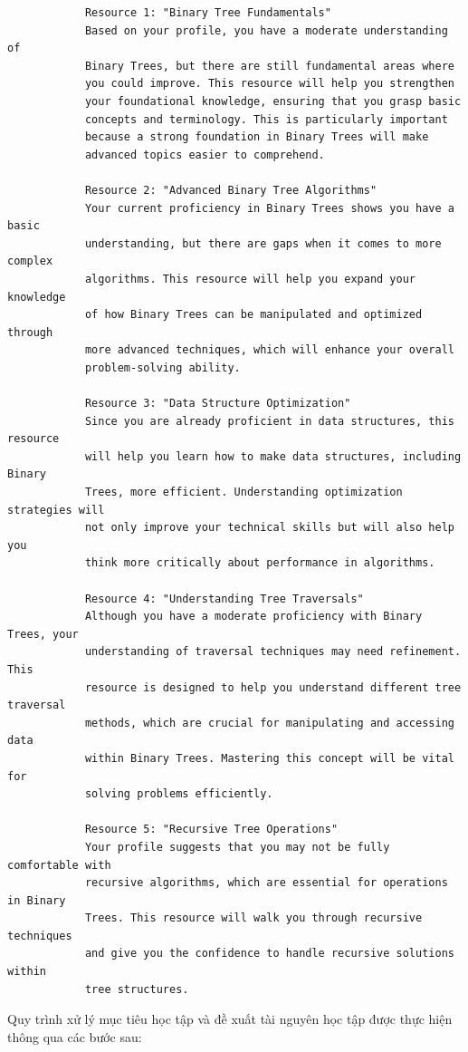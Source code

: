 \begin{verbatim}
            Resource 1: "Binary Tree Fundamentals"
            Based on your profile, you have a moderate understanding of
            Binary Trees, but there are still fundamental areas where
            you could improve. This resource will help you strengthen
            your foundational knowledge, ensuring that you grasp basic
            concepts and terminology. This is particularly important
            because a strong foundation in Binary Trees will make 
            advanced topics easier to comprehend.

            Resource 2: "Advanced Binary Tree Algorithms"
            Your current proficiency in Binary Trees shows you have a basic
            understanding, but there are gaps when it comes to more complex
            algorithms. This resource will help you expand your knowledge 
            of how Binary Trees can be manipulated and optimized through 
            more advanced techniques, which will enhance your overall 
            problem-solving ability.

            Resource 3: "Data Structure Optimization"
            Since you are already proficient in data structures, this resource
            will help you learn how to make data structures, including Binary
            Trees, more efficient. Understanding optimization strategies will
            not only improve your technical skills but will also help you 
            think more critically about performance in algorithms.

            Resource 4: "Understanding Tree Traversals"
            Although you have a moderate proficiency with Binary Trees, your
            understanding of traversal techniques may need refinement. This
            resource is designed to help you understand different tree traversal
            methods, which are crucial for manipulating and accessing data
            within Binary Trees. Mastering this concept will be vital for
            solving problems efficiently.

            Resource 5: "Recursive Tree Operations"
            Your profile suggests that you may not be fully comfortable with 
            recursive algorithms, which are essential for operations in Binary
            Trees. This resource will walk you through recursive techniques 
            and give you the confidence to handle recursive solutions within
            tree structures.
\end{verbatim}
Quy trình xử lý mục tiêu học tập và đề xuất tài nguyên học tập được thực hiện thông qua các bước sau:
